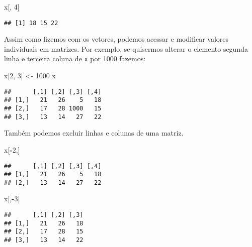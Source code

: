 \documentclass[
]{book}
\newenvironment{Shaded}{\begin{snugshade}}{\end{snugshade}}
\newcommand{\DecValTok}[1]{\textcolor[rgb]{0.00,0.00,0.81}{#1}}
\newcommand{\NormalTok}[1]{#1}
\newcommand{\OperatorTok}[1]{\textcolor[rgb]{0.81,0.36,0.00}{\textbf{#1}}}
\newcommand{\StringTok}[1]{\textcolor[rgb]{0.31,0.60,0.02}{#1}}
\begin{document}
\begin{Shaded}
\begin{Highlighting}[]
\NormalTok{x[, }\DecValTok{4}\NormalTok{]}
\end{Highlighting}
\end{Shaded}

\begin{verbatim}
## [1] 18 15 22
\end{verbatim}

Assim como fizemos com os vetores, podemos acessar e modificar valores individuais em matrizes. Por exemplo, se quisermos alterar o elemento segunda linha e terceira coluna de \texttt{x} por 1000 fazemos:

\begin{Shaded}
\begin{Highlighting}[]
\NormalTok{x[}\DecValTok{2}\NormalTok{, }\DecValTok{3}\NormalTok{] <-}\StringTok{ }\DecValTok{1000}
\NormalTok{x}
\end{Highlighting}
\end{Shaded}

\begin{verbatim}
##      [,1] [,2] [,3] [,4]
## [1,]   21   26    5   18
## [2,]   17   28 1000   15
## [3,]   13   14   27   22
\end{verbatim}

Também podemos excluir linhas e colunas de uma matriz.

\begin{Shaded}
\begin{Highlighting}[]
\NormalTok{x[}\OperatorTok{-}\DecValTok{2}\NormalTok{,]}
\end{Highlighting}
\end{Shaded}

\begin{verbatim}
##      [,1] [,2] [,3] [,4]
## [1,]   21   26    5   18
## [2,]   13   14   27   22
\end{verbatim}

\begin{Shaded}
\begin{Highlighting}[]
\NormalTok{x[,}\OperatorTok{-}\DecValTok{3}\NormalTok{]}
\end{Highlighting}
\end{Shaded}

\begin{verbatim}
##      [,1] [,2] [,3]
## [1,]   21   26   18
## [2,]   17   28   15
## [3,]   13   14   22
\end{verbatim}
\end{document}
